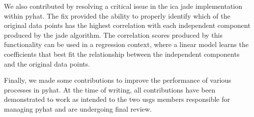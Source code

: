 We also contributed by resolving a critical issue in the \gls{ica} \gls{jade} implementation within \gls{pyhat}.
The fix provided the ability to properly identify which of the original data points has the highest correlation with each independent component produced by the \gls{jade} algorithm.
The correlation scores produced by this functionality can be used in a regression context, where a linear model learns the coefficients that best fit the relationship between the independent components and the original data points.

Finally, we made some contributions to improve the performance of various processes in \gls{pyhat}.
At the time of writing, all contributions have been demonstrated to work as intended to the two \gls{usgs} members responsible for managing \gls{pyhat} and are undergoing final review.
